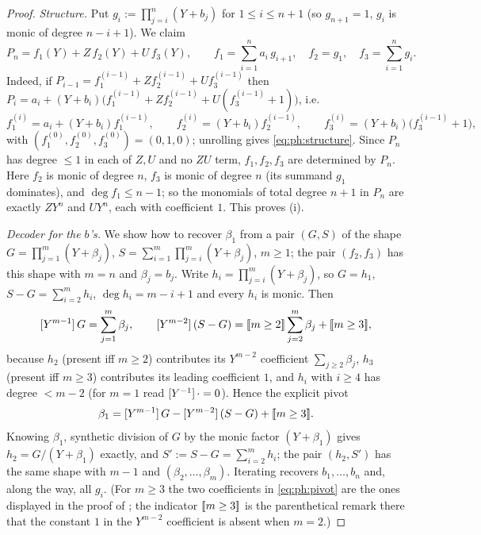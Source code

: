\begin{proof}
\emph{Structure.}  Put $g_i:=\prod_{j=i}^{n}(Y+b_j)$ for $1\le i\le n+1$
(so $g_{n+1}=1$, $g_i$ is monic of degree $n-i+1$).  We claim
\begin{equation}\label{eq:ph:structure}
  P_n=f_1(Y)+Z\,f_2(Y)+U\,f_3(Y),\qquad
  f_1=\sum_{i=1}^{n}a_i\,g_{i+1},\quad f_2=g_1,\quad f_3=\sum_{i=1}^{n}g_i .
\end{equation}
Indeed, if $P_{i-1}=f_1^{(i-1)}+Zf_2^{(i-1)}+Uf_3^{(i-1)}$ then
$P_i=a_i+(Y+b_i)\bigl(f_1^{(i-1)}+Zf_2^{(i-1)}+U(f_3^{(i-1)}+1)\bigr)$, i.e.
\[
  f_1^{(i)}=a_i+(Y+b_i)f_1^{(i-1)},\qquad
  f_2^{(i)}=(Y+b_i)f_2^{(i-1)},\qquad
  f_3^{(i)}=(Y+b_i)\bigl(f_3^{(i-1)}+1\bigr),
\]
with $(f_1^{(0)},f_2^{(0)},f_3^{(0)})=(0,1,0)$; unrolling gives
\eqref{eq:ph:structure}.  Since $P_n$ has degree $\le1$ in each of $Z,U$
and no $ZU$ term, $f_1,f_2,f_3$ are determined by $P_n$.
Here $f_2$ is monic of degree $n$, $f_3$ is monic of degree $n$
(its summand $g_1$ dominates), and $\deg f_1\le n-1$; so the monomials of
total degree $n+1$ in $P_n$ are exactly $ZY^n$ and $UY^n$, each with
coefficient $1$.  This proves (i).

\emph{Decoder for the $b$'s.}  We show how to recover $\beta_1$ from a pair
$(G,S)$ of the shape $G=\prod_{j=1}^{m}(Y+\beta_j)$, $S=\sum_{i=1}^{m}\prod_{j=i}^{m}(Y+\beta_j)$,
$m\ge1$; the pair $(f_2,f_3)$ has this shape with $m=n$ and $\beta_j=b_j$.
Write $h_i=\prod_{j=i}^{m}(Y+\beta_j)$, so $G=h_1$, $S-G=\sum_{i=2}^{m}h_i$,
$\deg h_i=m-i+1$ and every $h_i$ is monic.  Then
\begin{equation}\label{eq:ph:pivot}
  [Y^{m-1}]\,G=\sum_{j=1}^{m}\beta_j,\qquad
  [Y^{m-2}]\,(S-G)=[\![m\ge2]\!]\sum_{j=2}^{m}\beta_j+[\![m\ge3]\!],
\end{equation}
because $h_2$ (present iff $m\ge2$) contributes its $Y^{m-2}$ coefficient
$\sum_{j\ge2}\beta_j$, $h_3$ (present iff $m\ge3$) contributes its leading
coefficient $1$, and $h_i$ with $i\ge4$ has degree $<m-2$
(for $m=1$ read $[Y^{-1}]\,\cdot=0$).  Hence the explicit pivot
\begin{equation}\label{eq:ph:beta1}
  \beta_1=[Y^{m-1}]\,G-[Y^{m-2}]\,(S-G)+[\![m\ge3]\!].
\end{equation}
Knowing $\beta_1$, synthetic division of $G$ by the monic factor $(Y+\beta_1)$
gives $h_2=G/(Y+\beta_1)$ exactly, and $S':=S-G=\sum_{i=2}^{m}h_i$; the pair
$(h_2,S')$ has the same shape with $m-1$ and $(\beta_2,\dots,\beta_m)$.
Iterating recovers $b_1,\dots,b_n$ and, along the way, all $g_i$.
(For $m\ge3$ the two coefficients in \eqref{eq:ph:pivot} are the ones displayed
in the proof of ; the indicator $[\![m\ge3]\!]$
is the parenthetical remark there that the constant $1$ in the $Y^{m-2}$
coefficient is absent when $m=2$.)


\end{proof}
